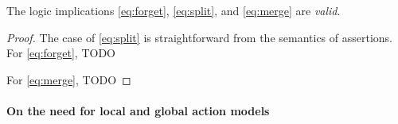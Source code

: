 \begin{lemma}
  \label{lem:semprinciples}
  The logic implications \eqref{eq:forget}, \eqref{eq:split}, and
  \eqref{eq:merge} are \emph{valid}.
\end{lemma}
\begin{proof}
The case of \eqref{eq:split} is
straightforward from the semantics of assertions.
For \eqref{eq:forget}, TODO

For \eqref{eq:merge}, TODO

\end{proof}




\paragraph{On the need for local and global action models}
\label{subsec:localGlobalActionModels}

